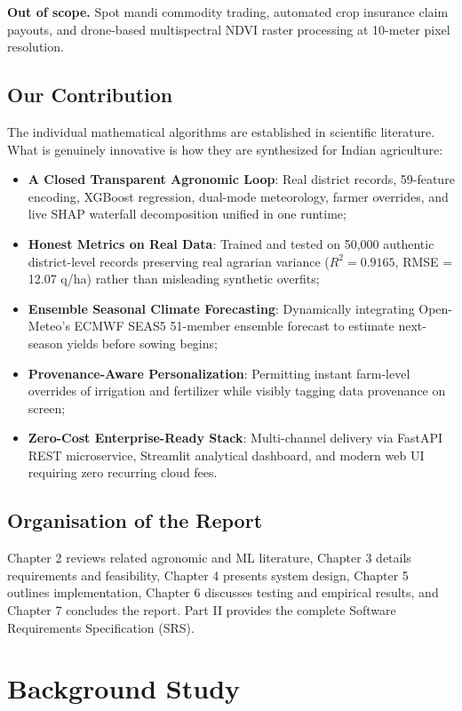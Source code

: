 \documentclass[11pt,a4paper]{report}
\begin{document}
\textbf{Out of scope.} Spot mandi commodity trading, automated crop insurance claim payouts, and drone-based multispectral NDVI raster processing at 10-meter pixel resolution.

\section{Our Contribution}
The individual mathematical algorithms are established in scientific literature. What is genuinely innovative is how they are synthesized for Indian agriculture:
\begin{itemize}
  \item \textbf{A Closed Transparent Agronomic Loop}: Real district records, 59-feature encoding, XGBoost regression, dual-mode meteorology, farmer overrides, and live SHAP waterfall decomposition unified in one runtime;
  \item \textbf{Honest Metrics on Real Data}: Trained and tested on 50,000 authentic district-level records preserving real agrarian variance ($R^2 = 0.9165$, RMSE = 12.07 q/ha) rather than misleading synthetic overfits;
  \item \textbf{Ensemble Seasonal Climate Forecasting}: Dynamically integrating Open-Meteo's ECMWF SEAS5 51-member ensemble forecast to estimate next-season yields before sowing begins;
  \item \textbf{Provenance-Aware Personalization}: Permitting instant farm-level overrides of irrigation and fertilizer while visibly tagging data provenance on screen;
  \item \textbf{Zero-Cost Enterprise-Ready Stack}: Multi-channel delivery via FastAPI REST microservice, Streamlit analytical dashboard, and modern web UI requiring zero recurring cloud fees.
\end{itemize}

\section{Organisation of the Report}
Chapter 2 reviews related agronomic and ML literature, Chapter 3 details requirements and feasibility, Chapter 4 presents system design, Chapter 5 outlines implementation, Chapter 6 discusses testing and empirical results, and Chapter 7 concludes the report. Part II provides the complete Software Requirements Specification (SRS).

\chapter{Background Study}
\end{document}
